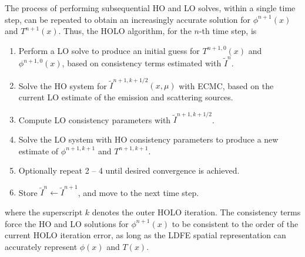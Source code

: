 The process of performing subsequential HO and LO solves, within a single time step, can be repeated to obtain an increasingly accurate solution for $\phi^{n+1}(x)$ and $T^{n+1}(x)$.  Thus, the HOLO algorithm, for the $n$-th time step, is
\begin{enumerate}
\item Perform a LO solve to produce an initial guess for $T^{n+1,0}(x)$
    and $\phi^{n+1,0}(x)$, based on consistency terms estimated with $\tilde{I}^{n}$.
\item Solve the HO system for $\tilde{I}^{n+1,k+1/2}(x,\mu)$ with ECMC, based on the current
    LO estimate of the emission and scattering sources.%
\item Compute LO consistency parameters with $\tilde{I}^{n+1,k+1/2}$.  
\item Solve the LO system with HO consistency parameters to produce a new
    estimate of $\phi^{n+1,k+1}$ and $T^{n+1,k+1}$.
\item Optionally repeat 2 -- 4 until desired convergence is achieved.
\item Store $\tilde{I}^{n}\leftarrow\tilde{I}^{n+1}$, and move to the next time step.
\end{enumerate}
where the superscript $k$ denotes the outer HOLO iteration.
The consistency terms force the HO
and LO solutions for $\phi^{n+1}(x)$ to be consistent to the order of the current HOLO
iteration error, as long as the LDFE spatial representation can accurately represent
$\phi(x)$ and $T(x)$.


